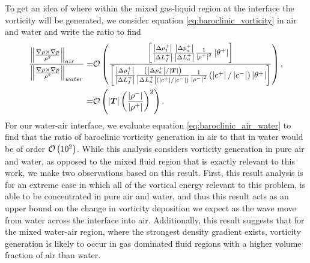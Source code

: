 To get an idea of where within the mixed gas-liquid region at the
interface the vorticity will be generated, we consider equation
\eqref{eq:baroclinic_vorticity} in air and water and write the ratio
to find
\begin{align}%
  \label{eq:baroclinic_air_water}%
  \frac{\norm{\frac{\nabla\rho\times\nabla p}{\rho^2}}_{air\quad}}{\norm{\frac{\nabla\rho\times\nabla p}{\rho^2}}_{water}}
  =&\orderof{\frac{\left[\frac{\abs{\Delta \rho_I^+}}{\abs{\Delta L_I^+}}\frac{\abs{\Delta p_a^+}}{\abs{\Delta L_a^+}}\frac{1}{\abs{\rho^+}^2}\abs{\theta^+}\right]}
     {\left[\frac{\abs{\Delta \rho_I^+}}{\abs{\Delta L_I^+}}\frac{\left(\abs{\Delta p_a^+}/\abs{\bs{T}}\right)}{\abs{\Delta L_a^+}\left(\abs{c^+}/\abs{c^-}\right)}\frac{1}{\abs{\rho^-}^2}\left(\abs{c^+}/\abs{c^-}\right)\abs{\theta^+}\right]}},\nonumber\\%
  =&\orderof{\abs{\bs{T}}\left(\frac{\abs{\rho^-}}{\abs{\rho^+}}\right)^2}.%
\end{align}
For our water-air interface, we evaluate equation
\eqref{eq:baroclinic_air_water} to find that the ratio of baroclinic
vorticity generation in air to that in water would be of order
$\mathcal{O}\left(10^2\right)$. While this analysis considers vorticity generation
in pure air and water, as opposed to the mixed fluid region that is
exactly relevant to this work, we make two observations based on this
result. First, this result analysis is for an extreme case in which
all of the vortical energy relevant to this problem, is able to be
concentrated in pure air and water, and thus this result acts as an
upper bound on the change in vorticity deposition we expect as the
wave move from water across the interface into air. Additionally, this
result suggests that for the mixed water-air region, where the
strongest density gradient exists, vorticity generation is likely to
occur in gas dominated fluid regions with a higher volume fraction of
air than water.

